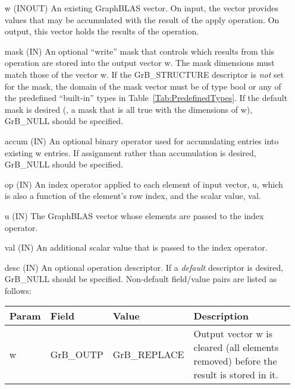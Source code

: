 \begin{itemize}[leftmargin=1.1in]
    \item[{\sf w}]    ({\sf INOUT}) An existing GraphBLAS vector.  On input,
    the vector provides values that may be accumulated with the result of the
    apply operation.  On output, this vector holds the results of the
    operation.

    \item[{\sf mask}] ({\sf IN}) An optional ``write'' mask that controls which
    results from this operation are stored into the output vector {\sf w}. The 
    mask dimensions must match those of the vector {\sf w}. If the 
    {\sf GrB\_STRUCTURE} descriptor is {\em not} set for the mask, the domain of the
    {\sf mask} vector must be of type {\sf bool} or any of the predefined 
    ``built-in'' types in Table~\ref{Tab:PredefinedTypes}.  If the default
    mask is desired (\ie, a mask that is all {\sf true} with the dimensions of {\sf w}), 
    {\sf GrB\_NULL} should be specified.

    \item[{\sf accum}] ({\sf IN}) An optional binary operator used for accumulating
    entries into existing {\sf w} entries. If assignment rather than accumulation is
    desired, {\sf GrB\_NULL} should be specified.

    \item[{\sf op}] ({\sf IN}) An index operator applied to each element of input 
    vector, {\sf u}, which is also a function of the element's row index, 
    and the scalar value, {\sf val}.

    \item[{\sf u}] ({\sf IN}) The GraphBLAS vector whose elements are passed 
    to the index operator.

    \item[{\sf val}] ({\sf IN}) An additional scalar value that is passed to the 
	index operator.
    
    \item[{\sf desc}] ({\sf IN}) An optional operation descriptor. If
    a \emph{default} descriptor is desired, {\sf GrB\_NULL} should be
    specified. Non-default field/value pairs are listed as follows:  \\

    \hspace*{-2em}\begin{tabular}{lllp{2.7in}}
        Param & Field  & Value & Description \\
        \hline
        {\sf w}    & {\sf GrB\_OUTP} & {\sf GrB\_REPLACE} & Output vector {\sf w}
        is cleared (all elements removed) before the result is stored in it.\\


\end{tabular}
\end{itemize}
